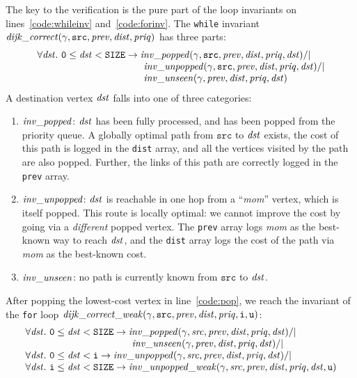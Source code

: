 The key to the verification is the pure part of the loop
invariants on lines~\ref{code:whileinv} and~\ref{code:forinv}.  The \texttt{while} invariant $\mathit{dijk\_correct}(\gamma, \texttt{src}, \mathit{prev}, \mathit{dist}, \mathit{priq})$ has three parts:
\[
\begin{array}{l}
\forall \m{dst}.~\texttt{0} \le \m{dst} < \texttt{SIZE} -> \m{inv\_popped}(\gamma, \texttt{src}, \m{prev}, \m{dist}, \m{priq}, \m{dst}) /| \null \\
\hspace{11em}\m{inv\_unpopped}(\gamma, \texttt{src}, \m{prev}, \m{dist}, \m{priq}, \m{dst}) /| \null \\
\hspace{11em}\m{inv\_unseen}(\gamma, \m{prev}, \m{dist}, \m{priq}, \m{dst})
\end{array}
\]
A destination vertex $\mathit{dst}$ falls into one of three
categories:
\begin{enumerate}
\item $\mathit{inv\_popped}$: $\mathit{dst}$ has been fully processed, and has been
popped from the priority queue.
A globally optimal path from $\texttt{src}$
to $\mathit{dst}$ exists, the cost of this path is logged in
the \texttt{dist} array, and all the vertices visited by the path are also popped.
Further, the links of this path are correctly logged in the \texttt{prev} array.
\item $\mathit{inv\_unpopped}$: $\mathit{dst}$ is reachable in
one hop from a ``\emph{mom}'' vertex, which is itself popped.
This route is locally optimal: we cannot
improve the cost by going via a \emph{different} popped vertex.
The \texttt{prev} array logs
\emph{mom} as the best-known way to reach $\mathit{dst}$, and the \texttt{dist}
array logs the cost of the path via \emph{mom} as the best-known cost.
\item $\mathit{inv\_unseen}$: no path is currently known from $\texttt{src}$ to $\mathit{dst}$.
\end{enumerate}
After popping the lowest-cost vertex in line~\ref{code:pop}, we reach the invariant of
the \texttt{for} loop $\mathit{dijk\_correct\_weak}(\gamma, \texttt{src}, \mathit{prev}, \mathit{dist}, \mathit{priq}, \texttt{i}, \texttt{u})$:
\[
\begin{array}{l}
\forall \m{dst}.~\texttt{0} \le \m{dst} < \texttt{SIZE} -> \m{inv\_popped}(\gamma, \m{src}, \m{prev}, \m{dist}, \m{priq}, \m{dst}) /| \null \\
\hspace{11em}\m{inv\_unseen}(\gamma, \m{prev}, \m{dist}, \m{priq}, \m{dst}) /| \null \\
\forall \m{dst}.~\texttt{0} \le \m{dst} < \texttt{i} -> \m{inv\_unpopped}(\gamma, \m{src}, \m{prev}, \m{dist}, \m{priq}, \m{dst}) /| \null \\
\forall \m{dst}.~\texttt{i} \le \m{dst} < \texttt{SIZE} -> \m{inv\_unpopped\_weak}(\gamma, \m{src}, \m{prev}, \m{dist}, \m{priq}, \m{dst}, \texttt{u})
\end{array}
\]
